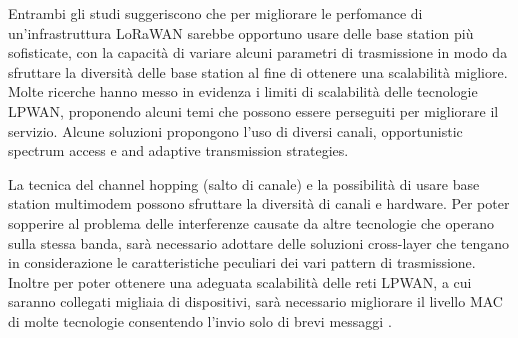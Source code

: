 \documentclass[12pt,a4paper,openright,twoside]{report}
\begin{document}
Entrambi gli studi \cite{K11} \cite{K12} suggeriscono che per migliorare le perfomance di un'infrastruttura LoRaWAN sarebbe opportuno usare delle base station pi\`u sofisticate, con la capacit\`a di variare alcuni parametri di trasmissione in modo da sfruttare la diversit\`a delle base station al fine di ottenere una scalabilit\`a migliore.
Molte ricerche hanno messo in evidenza i limiti di scalabilit\`a delle tecnologie LPWAN, proponendo alcuni temi che possono essere perseguiti per migliorare il servizio. 
Alcune soluzioni propongono l'uso di diversi canali, opportunistic spectrum access e  and adaptive transmission strategies. 

La tecnica del channel hopping (salto di canale) e la possibilit\`a di usare base station multimodem possono sfruttare la diversit\`a di canali e hardware.
Per poter sopperire al problema delle interferenze causate da altre tecnologie che operano sulla stessa banda, sar\`a necessario adottare delle soluzioni cross-layer che tengano in considerazione le caratteristiche peculiari dei vari pattern di trasmissione.
Inoltre per poter ottenere una adeguata scalabilit\`a delle reti LPWAN, a cui saranno collegati migliaia di dispositivi, sar\`a necessario migliorare il livello MAC di molte tecnologie consentendo l'invio solo di brevi messaggi \cite{K13}.
\end{document}
